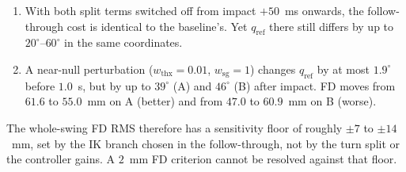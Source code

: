 \documentclass[11pt,a4paper]{article}
\begin{document}
\begin{enumerate}
\item With both split terms switched off from impact $+50$~ms onwards, the follow-through cost is identical to the baseline's. Yet $q_{\mathrm{ref}}$ there still differs by up to $20^\circ$--$60^\circ$ in the same coordinates.
\item A near-null perturbation ($w_{\mathrm{thx}}=0.01$, $w_{\mathrm{sg}}=1$) changes $q_{\mathrm{ref}}$ by at most $1.9^\circ$ before $1.0$~s, but by up to $39^\circ$ (A) and $46^\circ$ (B) after impact. FD moves from $61.6$ to $55.0$~mm on A (better) and from $47.0$ to $60.9$~mm on B (worse).
\end{enumerate}
The whole-swing FD RMS therefore has a sensitivity floor of roughly $\pm7$ to $\pm14$~mm, set by the IK branch chosen in the follow-through, not by the turn split or the controller gains. A $2$~mm FD criterion cannot be resolved against that floor.
\end{document}
